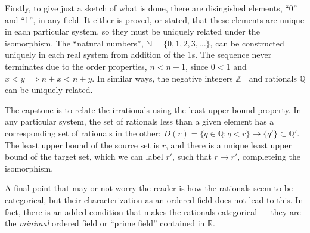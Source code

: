 Firstly, to give just a sketch of what is done, there are disingished
elements, ``0'' and ``1'', in any field. It either is proved, or stated,
that these elements are unique in each particular system, so they must
be uniquely related under the isomorphism. The ``natural numbers'',
\(\mathbb N=\{0,1,2,3,\dots\}\), can be constructed uniquely in each
real system from addition of the 1s. The sequence never terminates due
to the order properties, \(n\lt n+1\), since \(0\lt 1\) and
\(x\lt y\implies n+x\lt n+y\). In similar ways, the negative integers
\(\mathbb Z^-\) and rationals \(\mathbb Q\) can be uniquely related.

The capstone is to relate the irrationals using the least upper bound
property. In any particular system, the set of rationals less than a
given element has a corresponding set of rationals in the other:
\(D(r)=\{q\in \mathbb Q: q\lt r\}\rightarrow\{q'\}\subset\mathbb Q'\).
The least upper bound of the source set is \(r\), and there is a unique
least upper bound of the target set, which we can label \(r'\), such
that \(r\rightarrow r'\), completeing the isomorphism.

A final point that may or not worry the reader is how the rationals seem
to be categorical, but their characterization as an ordered field does
not lead to this. In fact, there is an added condition that makes the
rationals categorical --- they are the \emph{minimal} ordered field or
``prime field'' contained in \(\mathbb R\).
